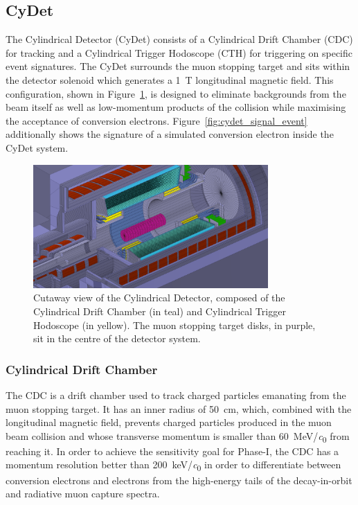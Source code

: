 \subsection{CyDet}
The Cylindrical Detector (CyDet) consists of a Cylindrical Drift Chamber (CDC)
for tracking and a Cylindrical Trigger Hodoscope (CTH) for triggering on
specific event signatures. The CyDet surrounds the muon stopping target and sits
within the detector solenoid which generates a \SI{1}{\tesla} longitudinal
magnetic field. This configuration, shown in Figure~\ref{fig:cydet}, is designed
to eliminate backgrounds from the beam itself as well as low-momentum products
of the collision while maximising the acceptance of conversion electrons.
Figure~\ref{fig:cydet_signal_event} additionally shows the signature of a
simulated conversion electron inside the CyDet system.

\begin{figure}
    \centering
    \includegraphics[width=0.8\textwidth]{chapter2/cydet_recolor.png}
    \caption{ Cutaway view of the Cylindrical Detector, composed of the
        Cylindrical Drift Chamber (in teal) and Cylindrical Trigger Hodoscope
        (in yellow). The muon stopping target disks, in purple, sit in the
        centre of the detector system. }
    \label{fig:cydet}
\end{figure}

\subsubsection{Cylindrical Drift Chamber}
The CDC is a drift chamber used to track charged particles emanating from the
muon stopping target. It has an inner radius of \SI{50}{\cm}, which, combined
with the longitudinal magnetic field, prevents charged particles produced in the
muon beam collision and whose transverse momentum is smaller than
\SI{60}{\MeV/\clight} from reaching it. In order to achieve the sensitivity goal
for Phase-I, the CDC has a momentum resolution better than
\SI{200}{\keV/\clight} in order to differentiate between conversion electrons
and electrons from the high-energy tails of the decay-in-orbit and radiative
muon capture spectra. 

